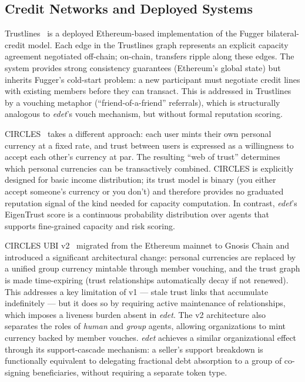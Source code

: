 \documentclass[11pt]{article}
\begin{document}
\subsection{Credit Networks and Deployed Systems}

Trustlines~\cite{trustlines2019} is a deployed Ethereum-based implementation of the Fugger bilateral-credit model. Each edge in the Trustlines graph represents an explicit capacity agreement negotiated off-chain; on-chain, transfers ripple along these edges. The system provides strong consistency guarantees (Ethereum's global state) but inherits Fugger's cold-start problem: a new participant must negotiate credit lines with existing members before they can transact. This is addressed in Trustlines by a vouching metaphor (``friend-of-a-friend'' referrals), which is structurally analogous to \emph{edet}'s vouch mechanism, but without formal reputation scoring.

CIRCLES~\cite{circles2020} takes a different approach: each user mints their own personal currency at a fixed rate, and trust between users is expressed as a willingness to accept each other's currency at par. The resulting ``web of trust'' determines which personal currencies can be transactively combined. CIRCLES is explicitly designed for basic income distribution; its trust model is binary (you either accept someone's currency or you don't) and therefore provides no graduated reputation signal of the kind needed for capacity computation. In contrast, \emph{edet}'s EigenTrust score is a continuous probability distribution over agents that supports fine-grained capacity and risk scoring.

CIRCLES UBI v2~\cite{circles2024} migrated from the Ethereum mainnet to Gnosis Chain and introduced a significant architectural change: personal currencies are replaced by a unified group currency mintable through member vouching, and the trust graph is made time-expiring (trust relationships automatically decay if not renewed). This addresses a key limitation of v1 --- stale trust links that accumulate indefinitely --- but it does so by requiring active maintenance of relationships, which imposes a liveness burden absent in \emph{edet}. The v2 architecture also separates the roles of \emph{human} and \emph{group} agents, allowing organizations to mint currency backed by member vouches. \emph{edet} achieves a similar organizational effect through its support-cascade mechanism: a seller's support breakdown is functionally equivalent to delegating fractional debt absorption to a group of co-signing beneficiaries, without requiring a separate token type.
\end{document}
